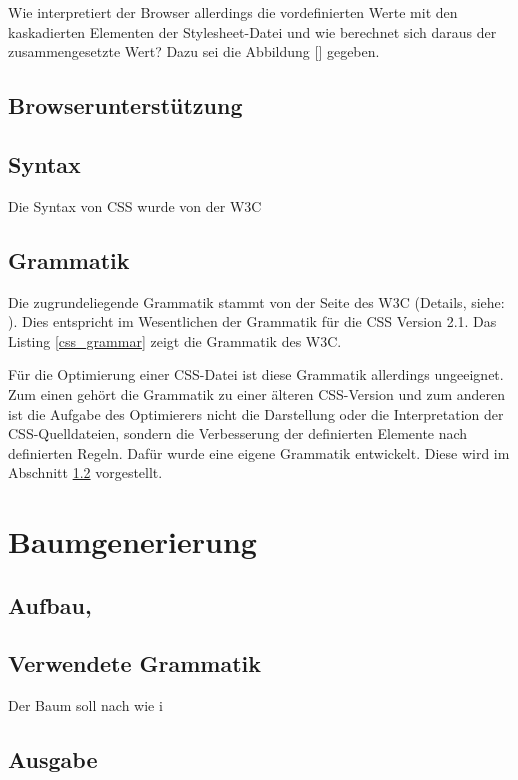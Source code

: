 \documentclass[11pt]{scrartcl}
\begin{document}
Wie interpretiert der Browser allerdings die vordefinierten Werte mit den kaskadierten Elementen der Stylesheet-Datei und wie berechnet sich daraus der zusammengesetzte Wert? Dazu sei die Abbildung [] gegeben. %



\subsection{Browserunterstützung}
\subsection{Syntax}
Die Syntax von CSS wurde von der W3C 
\cite{w3c_css_syntax}
\subsection{Grammatik}
Die zugrundeliegende Grammatik stammt von der Seite des W3C (Details, siehe: \cite{w3c_css_grammar}). Dies entspricht im Wesentlichen der Grammatik für die CSS Version 2.1. Das Listing \ref{css_grammar} zeigt die Grammatik des W3C. 

Für die Optimierung einer CSS-Datei ist diese Grammatik allerdings ungeeignet. Zum einen gehört die Grammatik zu einer älteren CSS-Version und zum anderen ist die Aufgabe des Optimierers nicht die Darstellung oder die Interpretation der CSS-Quelldateien, sondern die Verbesserung der definierten Elemente nach definierten Regeln. Dafür wurde eine eigene Grammatik entwickelt. Diese wird im Abschnitt \ref{tree_generation_used_grammar} vorgestellt. 


\pagebreak
\section{Baumgenerierung}
\subsection{Aufbau,}
\subsection{Verwendete Grammatik}
\label{tree_generation_used_grammar}
Der Baum soll nach wie i
\subsection{Ausgabe}
\end{document}
